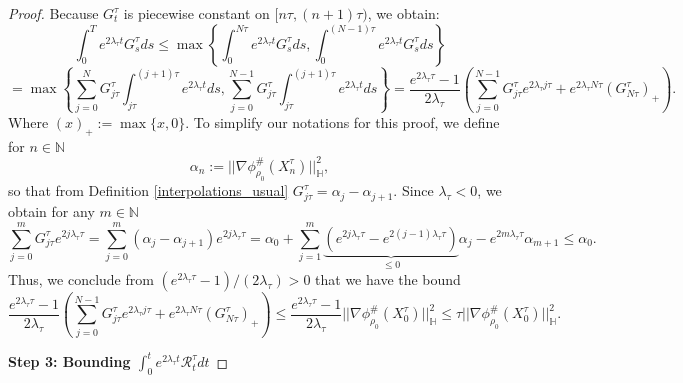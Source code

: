 \documentclass[11pt,a4paper]{amsart}
\newcommand{\1}{\mathds{1}}
\newcommand{\N}{\mathbb{N}}
\numberwithin{equation}{section}
\begin{document}
\begin{proof}
Because $G^{\tau}_t$ is piecewise constant on $[n \tau,(n+1)\tau)$, we obtain:
\[
\int_0^T e^{2 \lambda_{\tau}t}  G^{\tau}_s ds \leq \max \left\{ \int_0^{N \tau}  e^{2 \lambda_{\tau}t}  G^{\tau}_s ds , \int_0^{(N-1)\tau}  e^{2 \lambda_{\tau}t}  G^{\tau}_s ds  \right\} 
\]  
\[
= \max \left\{ \sum_{j=0}^{N} G^{\tau}_{j \tau} \int_{j \tau}^{(j+1)\tau} e^{2 \lambda_{\tau}t}  ds, \sum_{j=0}^{N-1} G^{\tau}_{j \tau} \int_{j \tau}^{(j+1)\tau} e^{2 \lambda_{\tau}t}  ds  \right\} =  \frac{e^{2 \lambda_{\tau} \tau} - 1}{2 \lambda_{\tau}}  \left( \sum_{j=0}^{N-1} G_{j \tau}^{\tau}  e^{2 \lambda_{\tau} j \tau} + e^{2 \lambda_{\tau} N\tau}(G^{\tau}_{N\tau})_{+} \right).  
\] Where $(x)_+ := \max\{x,0\}$. To simplify our notations for this proof, we define for $n \in \N$
\begin{equation}
\alpha_n := ||\nabla \phi^{\#}_{\rho_0}(X_n^{\tau})||^2_{\mathbb{H}}, \label{alpha_def}
\end{equation}
so that from Definition \ref{interpolations_usual} $G^{\tau}_{j \tau} = \alpha_j - \alpha_{j+1}$. Since $\lambda_{\tau} < 0$, we obtain for any $m \in \N$
\[
\sum_{j=0}^{m} G^{\tau}_{j \tau} e^{2 j \lambda_{\tau} \tau} = \sum_{j=0}^{m} (\alpha_j - \alpha_{j+1}) e^{2 j \lambda_{\tau} \tau} = \alpha_0 + \sum_{j=1}^{m} \underbrace{(e^{2 j \lambda_{\tau} \tau} - e^{2 (j-1) \lambda_{\tau} \tau})}_{\leq 0} \alpha_j - e^{2m \lambda_{\tau} \tau} \alpha_{m+1} \leq \alpha_0.
\]  
Thus, we conclude from $(e^{2\lambda_{\tau} \tau} - 1)/(2 \lambda_{\tau}) >0$ that we have the bound
\[ \frac{e^{2 \lambda_{\tau} \tau} - 1}{2 \lambda_{\tau}}  \left( \sum_{j=0}^{N-1} G_{j \tau}^{\tau}  e^{2 \lambda_{\tau} j \tau} + e^{2 \lambda_{\tau} N\tau}(G^{\tau}_{N\tau})_{+} \right) \leq \frac{e^{2 \lambda_{\tau} \tau} - 1}{2 \lambda_{\tau}} ||\nabla \phi^{\#}_{\rho_0}(X_0^{\tau})||^2_{\mathbb{H}} \leq \tau ||\nabla \phi^{\#}_{\rho_0}(X_0^{\tau})||^2_{\mathbb{H}} .
\]

\noindent \textbf{Step 3: Bounding $\int_0^t e^{2 \lambda_{\tau} t} \mathcal{R}_t^{\tau} dt$}


\end{proof}
\end{document}
